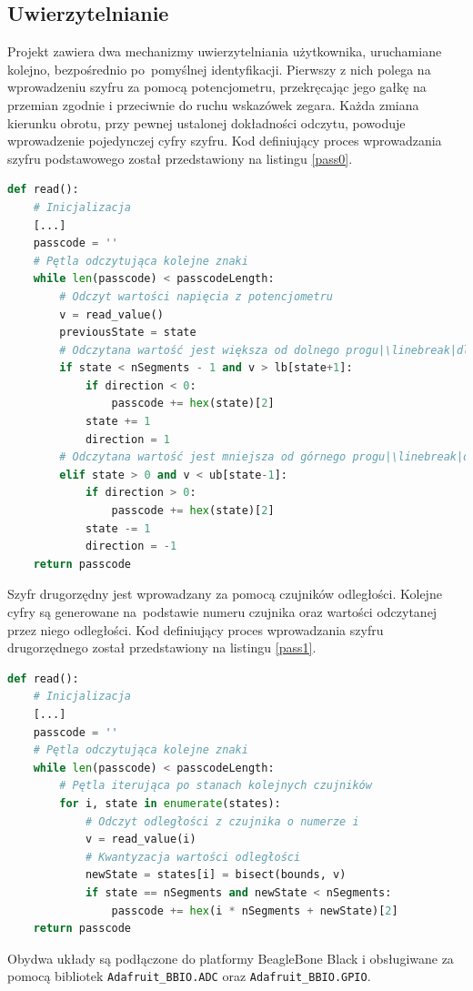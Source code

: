 \documentclass[polish,polish,a4paper]{article}
\begin{document}
	\subsection{Uwierzytelnianie}
	Projekt zawiera dwa mechanizmy uwierzytelniania użytkownika, uruchamiane kolejno, bezpośrednio po~pomyślnej identyfikacji. Pierwszy z nich polega na wprowadzeniu szyfru za pomocą potencjometru, przekręcając jego gałkę na przemian zgodnie i przeciwnie do ruchu wskazówek zegara. Każda zmiana kierunku obrotu, przy pewnej ustalonej dokładności odczytu, powoduje wprowadzenie pojedynczej cyfry szyfru. Kod definiujący proces wprowadzania szyfru podstawowego został przedstawiony na listingu \ref{pass0}.
	\begin{lstlisting}[language=Python, caption={Fragment kodu sterującego wprowadzaniem szyfru podstawowego}, label=pass0]
def read():
	# Inicjalizacja
	[...]
	passcode = ''
	# Pętla odczytująca kolejne znaki
	while len(passcode) < passcodeLength:
		# Odczyt wartości napięcia z potencjometru
		v = read_value()
		previousState = state
		# Odczytana wartość jest większa od dolnego progu|\linebreak|dla cyfry większej o 1
		if state < nSegments - 1 and v > lb[state+1]:
			if direction < 0:
				passcode += hex(state)[2]
			state += 1
			direction = 1
		# Odczytana wartość jest mniejsza od górnego progu|\linebreak|dla cyfry mniejszej o 1
		elif state > 0 and v < ub[state-1]:
			if direction > 0:
				passcode += hex(state)[2]
			state -= 1
			direction = -1
	return passcode
	\end{lstlisting}
	Szyfr drugorzędny jest wprowadzany za pomocą czujników odległości. Kolejne cyfry są generowane na~podstawie numeru czujnika oraz wartości odczytanej przez niego odległości. Kod definiujący proces wprowadzania szyfru drugorzędnego został przedstawiony na listingu \ref{pass1}.
	\begin{lstlisting}[language=Python, caption={Fragment kodu sterującego wprowadzaniem szyfru drugorzędnego}, label=pass1]
def read():
	# Inicjalizacja
	[...]
	passcode = ''
	# Pętla odczytująca kolejne znaki
	while len(passcode) < passcodeLength:
		# Pętla iterująca po stanach kolejnych czujników
		for i, state in enumerate(states):
			# Odczyt odległości z czujnika o numerze i
			v = read_value(i)
			# Kwantyzacja wartości odległości
			newState = states[i] = bisect(bounds, v)
			if state == nSegments and newState < nSegments:
				passcode += hex(i * nSegments + newState)[2]
	return passcode
	\end{lstlisting}
	Obydwa układy są podłączone do platformy BeagleBone Black i obsługiwane za pomocą bibliotek \linebreak\verb|Adafruit_BBIO.ADC| oraz \verb|Adafruit_BBIO.GPIO|.
	
\end{document}
